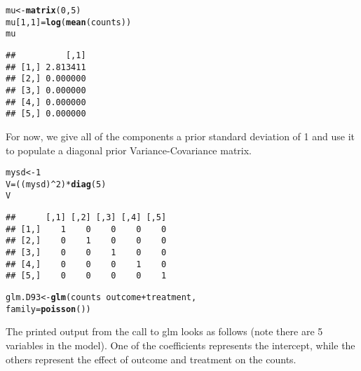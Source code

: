 \documentclass{article}\usepackage[]{graphicx}\usepackage[]{color}
\makeatletter
\newcommand{\hlnum}[1]{\textcolor[rgb]{0.686,0.059,0.569}{#1}}%
\newcommand{\hlopt}[1]{\textcolor[rgb]{0,0,0}{#1}}%
\newcommand{\hlstd}[1]{\textcolor[rgb]{0.345,0.345,0.345}{#1}}%
\newcommand{\hlkwb}[1]{\textcolor[rgb]{0.69,0.353,0.396}{#1}}%
\newcommand{\hlkwc}[1]{\textcolor[rgb]{0.333,0.667,0.333}{#1}}%
\newcommand{\hlkwd}[1]{\textcolor[rgb]{0.737,0.353,0.396}{\textbf{#1}}}%
\newenvironment{kframe}{%
 \def\at@end@of@kframe{}%
 \ifinner\ifhmode%
  \def\at@end@of@kframe{\end{minipage}}%
  \begin{minipage}{\columnwidth}%
 \fi\fi%
 \def\FrameCommand##1{\hskip\@totalleftmargin \hskip-\fboxsep
 \colorbox{shadecolor}{##1}\hskip-\fboxsep
     \hskip-\linewidth \hskip-\@totalleftmargin \hskip\columnwidth}%
 \MakeFramed {\advance\hsize-\width
   \@totalleftmargin\z@ \linewidth\hsize
   \@setminipage}}%
 {\par\unskip\endMakeFramed%
 \at@end@of@kframe}
\newenvironment{knitrout}{}{} %
\makeatother
\begin{document}
\begin{knitrout}
\color{fgcolor}\begin{kframe}
\begin{alltt}
\hlstd{mu}\hlkwb{<-}\hlkwd{matrix}\hlstd{(}\hlnum{0}\hlstd{,}\hlnum{5}\hlstd{)}
\hlstd{mu[}\hlnum{1}\hlstd{,}\hlnum{1}\hlstd{]}\hlkwb{=}\hlkwd{log}\hlstd{(}\hlkwd{mean}\hlstd{(counts))}
\hlstd{mu}
\end{alltt}
\begin{verbatim}
##          [,1]
## [1,] 2.813411
## [2,] 0.000000
## [3,] 0.000000
## [4,] 0.000000
## [5,] 0.000000
\end{verbatim}
\end{kframe}
\end{knitrout}

For now, we give all of the components a prior standard deviation of 1 and use it to populate a diagonal prior Variance-Covariance matrix.

\begin{knitrout}
\color{fgcolor}\begin{kframe}
\begin{alltt}
\hlstd{mysd}\hlkwb{<-}\hlnum{1}
\hlstd{V}\hlkwb{=}\hlstd{((mysd)}\hlopt{^}\hlnum{2}\hlstd{)}\hlopt{*}\hlkwd{diag}\hlstd{(}\hlnum{5}\hlstd{)}
\hlstd{V}
\end{alltt}
\begin{verbatim}
##      [,1] [,2] [,3] [,4] [,5]
## [1,]    1    0    0    0    0
## [2,]    0    1    0    0    0
## [3,]    0    0    1    0    0
## [4,]    0    0    0    1    0
## [5,]    0    0    0    0    1
\end{verbatim}
\end{kframe}
\end{knitrout}


\begin{knitrout}
\color{fgcolor}\begin{kframe}
\begin{alltt}
\hlstd{glm.D93} \hlkwb{<-} \hlkwd{glm}\hlstd{(counts} \hlopt{~} \hlstd{outcome} \hlopt{+} \hlstd{treatment,}
              \hlkwc{family} \hlstd{=} \hlkwd{poisson}\hlstd{())}
\end{alltt}
\end{kframe}
\end{knitrout}

The printed output from the call to glm looks as follows (note there are 5 variables in the model). One of the coefficients represents the intercept, while the others represent the effect of outcome and treatment on the counts.
\end{document}

